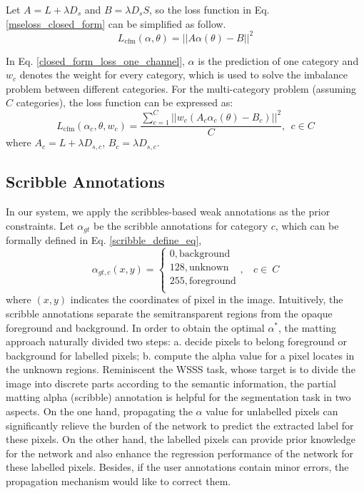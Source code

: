\documentclass[journal]{IEEEtran}
\begin{document}
Let $A = L+\lambda D_s$ and $B = \lambda D_s S$, so the loss function in Eq. \ref{mseloss_closed_form} can be simplified as follow. 
\begin{equation}
    L_{\text{cfm}}(\alpha, \theta) = ||A \alpha(\theta) - B||^2
    \label{closed_form_loss_one_channel}
\end{equation}

In Eq. \ref{closed_form_loss_one_channel}, $\alpha$ is the prediction of one category and $w_c$ denotes the weight for every category, which is used to solve the imbalance problem between different categories. For the multi-category problem (assuming $C$ categories), the loss function can be expressed as:
\begin{equation}
    L_{\text{cfm}}(\alpha_c, \theta, w_c) = \frac{\sum\limits_{c=1}^{C} ||w_c(A_c \alpha_{c}(\theta) - B_c)||^2}{C},~~c\in C
    \label{closed_form_loss_mul_channel}
\end{equation}
where $A_c = L + \lambda D_{s,c}$, $B_c = \lambda D_{s,c}$.

\subsection{Scribble Annotations}
\label{subsec:weak-annotations}
In our system, we apply the scribbles-based weak annotations as the prior constraints. Let $\alpha_{gt}$ be the scribble annotations for category $c$, which can be formally defined in Eq. \ref{scribble_define_eq}, 
\begin{equation}
    \alpha_{gt,c}(x, y) =
    \begin{cases}
      0, \text{background} \\
      128, \text{unknown} \\
      255, \text{foreground} \\ 
    \end{cases}, ~~~~c\in~C
    \label{scribble_define_eq}
\end{equation}
where $(x, y)$ indicates the coordinates of pixel in the image. Intuitively, the scribble annotations separate the semitransparent regions from the opaque foreground and background. In order to obtain the optimal $\alpha^*$, the matting approach naturally divided two steps: a. decide pixels to belong foreground or background for labelled pixels; b. compute the alpha value for a pixel locates in the unknown regions. Reminiscent the WSSS task, whose target is to divide the image into discrete parts according to the semantic information, the partial matting alpha (scribble) annotation is helpful for the segmentation task in two aspects. On the one hand, propagating the $\alpha$ value for unlabelled pixels can significantly relieve the burden of the network to predict the extracted label for these pixels. On the other hand, the labelled pixels can provide prior knowledge for the network and also enhance the regression performance of the network for these labelled pixels. Besides, if the user annotations contain minor errors, the propagation mechanism would like to correct them. 
\end{document}
